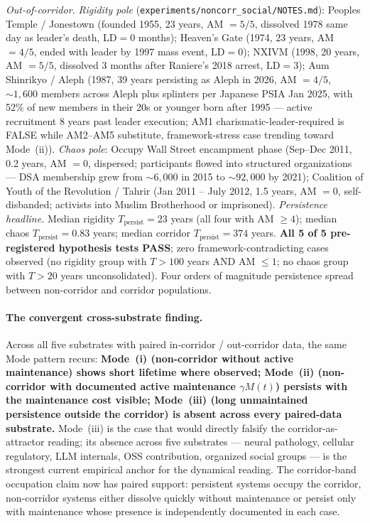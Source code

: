 \documentclass[11pt,a4paper]{article}
\begin{document}
\emph{Out-of-corridor.} \emph{Rigidity pole} (\texttt{experiments/noncorr\_social/NOTES.md}): Peoples Temple / Jonestown (founded 1955, 23 years, AM $= 5/5$, dissolved 1978 same day as leader's death, $\text{LD} = 0$ months); Heaven's Gate (1974, 23 years, AM $= 4/5$, ended with leader by 1997 mass event, $\text{LD} = 0$); NXIVM (1998, 20 years, AM $= 5/5$, dissolved 3 months after Raniere's 2018 arrest, $\text{LD} = 3$); Aum Shinrikyo / Aleph (1987, 39 years persisting as Aleph in 2026, AM $= 4/5$, $\sim 1{,}600$ members across Aleph plus splinters per Japanese PSIA Jan 2025, with 52\% of new members in their 20s or younger born after 1995 --- active recruitment 8 years past leader execution; AM1 charismatic-leader-required is FALSE while AM2--AM5 substitute, framework-stress case trending toward Mode~(ii)). \emph{Chaos pole}: Occupy Wall Street encampment phase (Sep--Dec 2011, 0.2 years, AM $= 0$, dispersed; participants flowed into structured organizations --- DSA membership grew from $\sim 6{,}000$ in 2015 to $\sim 92{,}000$ by 2021); Coalition of Youth of the Revolution / Tahrir (Jan 2011 -- July 2012, 1.5 years, AM $= 0$, self-disbanded; activists into Muslim Brotherhood or imprisoned). \emph{Persistence headline.} Median rigidity $T_{\text{persist}} = 23$ years (all four with AM $\ge 4$); median chaos $T_{\text{persist}} = 0.83$ years; median corridor $T_{\text{persist}} = 374$ years. \textbf{All 5 of 5 pre-registered hypothesis tests PASS}; zero framework-contradicting cases observed (no rigidity group with $T > 100$ years AND AM $\le 1$; no chaos group with $T > 20$ years unconsolidated). Four orders of magnitude persistence spread between non-corridor and corridor populations.

\paragraph{The convergent cross-substrate finding.}

Across all five substrates with paired in-corridor / out-corridor data, the same Mode pattern recurs: \textbf{Mode~(i) (non-corridor without active maintenance) shows short lifetime where observed; Mode~(ii) (non-corridor with documented active maintenance $\gamma M(t)$) persists with the maintenance cost visible; Mode~(iii) (long unmaintained persistence outside the corridor) is absent across every paired-data substrate.} Mode~(iii) is the case that would directly falsify the corridor-as-attractor reading; its absence across five substrates --- neural pathology, cellular regulatory, LLM internals, OSS contribution, organized social groups --- is the strongest current empirical anchor for the dynamical reading. The corridor-band occupation claim now has paired support: persistent systems occupy the corridor, non-corridor systems either dissolve quickly without maintenance or persist only with maintenance whose presence is independently documented in each case.
\end{document}
